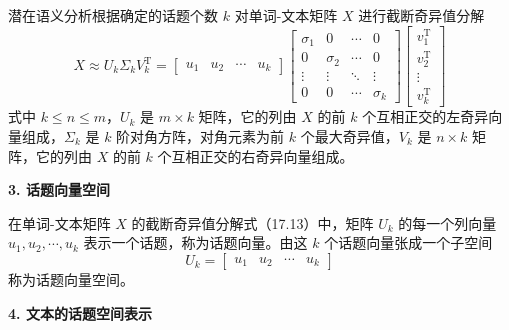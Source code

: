 \documentclass[UTF8,12pt,a4paper,fontset=fandol]{ctexart}
\begin{document}
潜在语义分析根据确定的话题个数 $k$ 对单词-文本矩阵 $X$ 进行截断奇异值分解
\begin{equation}
X\approx U_k\Sigma_kV_k^{\mathrm{T}}
=
\begin{bmatrix}
u_1 & u_2 & \cdots & u_k
\end{bmatrix}
\begin{bmatrix}
\sigma_1 & 0 & \cdots & 0\\
0 & \sigma_2 & \cdots & 0\\
\vdots & \vdots & \ddots & \vdots\\
0 & 0 & \cdots & \sigma_k
\end{bmatrix}
\begin{bmatrix}
v_1^{\mathrm{T}}\\
v_2^{\mathrm{T}}\\
\vdots\\
v_k^{\mathrm{T}}
\end{bmatrix}
\tag{17.13}
\end{equation}
式中 $k\leqslant n\leqslant m$，$U_k$ 是 $m\times k$ 矩阵，它的列由 $X$ 的前 $k$ 个互相正交的左奇异向量组成，$\Sigma_k$ 是 $k$ 阶对角方阵，对角元素为前 $k$ 个最大奇异值，$V_k$ 是 $n\times k$ 矩阵，它的列由 $X$ 的前 $k$ 个互相正交的右奇异向量组成。

\noindent\textbf{3. 话题向量空间}

在单词-文本矩阵 $X$ 的截断奇异值分解式（17.13）中，矩阵 $U_k$ 的每一个列向量 $u_1,u_2,\cdots,u_k$ 表示一个话题，称为话题向量。由这 $k$ 个话题向量张成一个子空间
\[
U_k=
\begin{bmatrix}
u_1 & u_2 & \cdots & u_k
\end{bmatrix}
\]
称为话题向量空间。

\noindent\textbf{4. 文本的话题空间表示}
\end{document}
